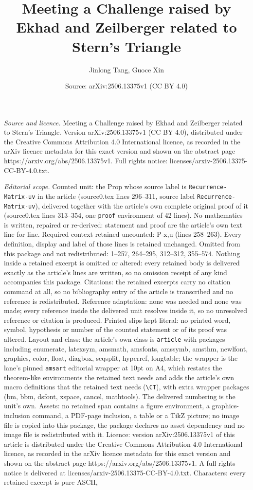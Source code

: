 \documentclass[10pt,a4paper]{amsart}
\title[Meeting a Challenge raised by Ekhad and Zeilberger related t]{Meeting a Challenge raised by Ekhad and Zeilberger related to Stern's Triangle}
\author{Jinlong Tang, Guoce Xin}
\date{Source: arXiv:2506.13375v1 (CC BY 4.0)}
\begin{document}
\maketitle

\noindent\emph{Source and licence.} Meeting a Challenge raised by Ekhad and Zeilberger related to Stern's Triangle. Version arXiv:2506.13375v1 (CC BY 4.0), distributed under the Creative Commons Attribution 4.0 International licence, as recorded in the arXiv licence metadata for this exact version and shown on the abstract page https://arxiv.org/abs/2506.13375v1. Full rights notice: licenses/arxiv-2506.13375-CC-BY-4.0.txt.\par\smallskip

\noindent\textit{Editorial scope.} Counted unit: the Prop whose source label is \texttt{Recurrence-Matrix-uv} in the article (source0.tex lines 296--311, source label \texttt{Recurrence-Matrix-uv}), delivered together with the article's own complete original proof of it (source0.tex lines 313--354, one \texttt{proof} environment of 42 lines). No mathematics is written, repaired or re-derived: statement and proof are the article's own text line for line. Required context retained uncounted: P-x,u (lines 258--263). Every definition, display and label of those lines is retained unchanged. Omitted from this package and not redistributed: 1--257, 264--295, 312--312, 355--574. Nothing inside a retained excerpt is omitted or altered: every retained body is delivered exactly as the article's lines are written, so no omission receipt of any kind accompanies this package. Citations: the retained excerpts carry no citation command at all, so no bibliography entry of the article is transcribed and no reference is redistributed. Reference adaptation: none was needed and none was made; every reference inside the delivered unit resolves inside it, so no unresolved reference or citation is produced. Printed slips kept literal: no printed word, symbol, hypothesis or number of the counted statement or of its proof was altered. Layout and class: the article's own class is \texttt{article} with packages including enumerate, latexsym, amsmath, amsfonts, amssymb, amsthm, newlfont, graphics, color, float, diagbox, seqsplit, hyperref, longtable; the wrapper is the lane's pinned \texttt{amsart} editorial wrapper at 10pt on A4, which restates the theorem-like environments the retained text needs and adds the article's own macro definitions that the retained text needs (\texttt{\textbackslash CT}), with extra wrapper packages (bm, bbm, dsfont, xspace, cancel, mathtools). The delivered numbering is the unit's own. Assets: no retained span contains a figure environment, a graphics-inclusion command, a PDF-page inclusion, a table or a TikZ picture; no image file is copied into this package, the package declares no asset dependency and no image file is redistributed with it. Licence: version arXiv:2506.13375v1 of this article is distributed under the Creative Commons Attribution 4.0 International licence, as recorded in the arXiv licence metadata for this exact version and shown on the abstract page https://arxiv.org/abs/2506.13375v1. A full rights notice is delivered at licenses/arxiv-2506.13375-CC-BY-4.0.txt. Characters: every retained excerpt is pure ASCII, 
\end{document}
